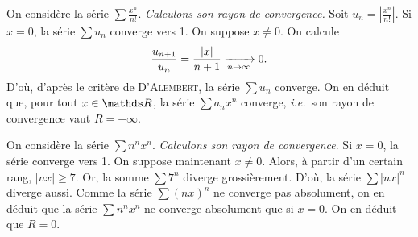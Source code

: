 \begin{exm}[$R= +\infty$]
	On considère la série $\sum \frac{x^n}{n!}$. \textsl{Calculons son rayon de convergence.}
	Soit $u_n = \left| \frac{x^n}{n!} \right|$.
	Si $x = 0$, la série $\sum u_n$\/ converge vers 1.
	On suppose $x \neq 0$. On calcule  \[
		\frac{u_{n+1}}{u_n} = \frac{|x|}{n+1} \xrightarrow[n\to \infty]{} 0
	.\] D'où, d'après le critère de \textsc{D'Alembert}, la série $\sum u_n$ converge.
	On en déduit que, pour tout $x \in \R$, la série $\sum a_n x^n$\/ converge, \textit{i.e.}\ son rayon de convergence vaut $R = +\infty$.
\end{exm}

\begin{exm}[$R=0$]
	On considère la série $\sum n^n x^n$. \textsl{Calculons son rayon de convergence}. Si $x = 0$, la série converge vers 1. On suppose maintenant $x \neq 0$. Alors, à partir d'un certain rang, $|nx| \ge 7$. Or, la somme $\sum 7^n$\/ diverge grossièrement. D'où, la série $\sum |nx|^n$\/ diverge aussi. Comme la série $\sum (nx)^n$\/ ne converge pas absolument, on en déduit que la série $\sum n^n x^n$\/ ne converge absolument que si $x = 0$. On en déduit que $R = 0$.
\end{exm}
